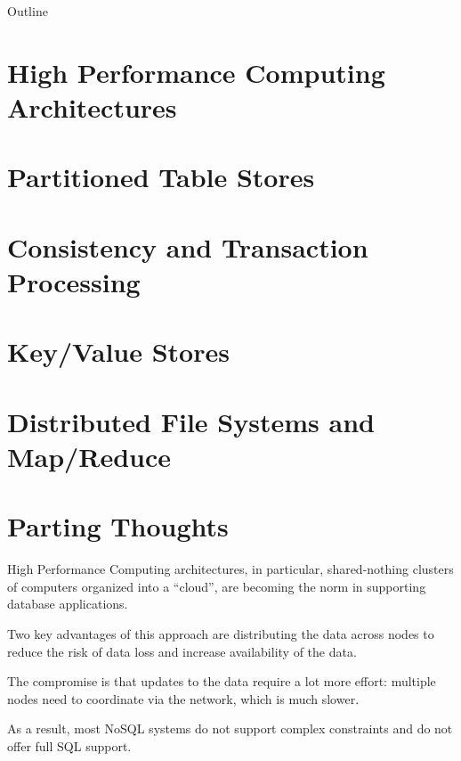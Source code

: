 \documentclass[xcolor={usenames,dvipsnames}
    ,handout
]{beamer}
\begin{document}
\begin{frame}{Outline}
\tableofcontents
\end{frame}

\section{High Performance Computing Architectures}


\section{Partitioned Table Stores}


\section{Consistency and Transaction Processing}


\section{Key/Value Stores}


\section{Distributed File Systems and Map/Reduce}


\section{Parting Thoughts}

\begin{frame}

High Performance Computing architectures, in particular, shared-nothing clusters of computers organized into a ``cloud'', are becoming the norm in supporting database applications.

Two key advantages of this approach are distributing the data across nodes to reduce the risk of data loss and increase availability of the data.

The compromise is that updates to the data require a lot more effort: multiple nodes need to coordinate via the network, which is much slower.

As a result, most NoSQL systems do not support complex constraints and do not offer full SQL support.
\end{frame}
\end{document}
